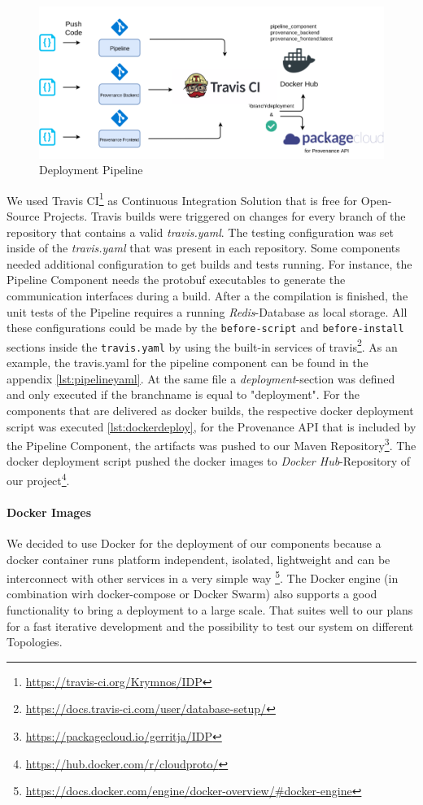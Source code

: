 \begin{figure}[h!]
	\includegraphics[width=\textwidth]{figures/deployment.png}
	\caption{Deployment Pipeline}
	\label{fig:deployment}
\end{figure}


We used Travis CI\footnote{\url{https://travis-ci.org/Krymnos/IDP}} as Continuous Integration Solution that is free for Open-Source Projects. Travis builds were triggered on changes for every branch of the repository that contains a valid \emph{travis.yaml}.
The testing configuration was set inside of the \emph{travis.yaml} that was present in each repository. Some components needed additional configuration to get builds and tests running. For instance, the Pipeline Component needs the protobuf executables to generate the communication interfaces during a build. After a the compilation is finished, the unit tests of the Pipeline requires a running \emph{Redis}-Database as local storage. All these configurations could be made by the \texttt{before-script} and \texttt{before-install} sections inside the \texttt{travis.yaml} by using the built-in services of travis\footnote{\url{https://docs.travis-ci.com/user/database-setup/}}. As an example, the travis.yaml for the pipeline component can be found in the appendix \ref{lst:pipelineyaml}.
At the same file a \emph{deployment}-section was defined and only executed if the branchname is equal to "deployment". For the components that are delivered as docker builds, the respective docker deployment script was executed \ref{lst:dockerdeploy}, for the Provenance API that is included by the Pipeline Component, the artifacts was pushed to our Maven Repository\footnote{\url{https://packagecloud.io/gerritja/IDP}}. The docker deployment script pushed the docker images to \emph{Docker Hub}-Repository of our project\footnote{\url{https://hub.docker.com/r/cloudproto/}}.

\paragraph*{Docker Images}
We decided to use Docker for the deployment of our components because a docker container runs platform independent, isolated, lightweight and can be interconnect with other services in a very simple way \footnote{\url{https://docs.docker.com/engine/docker-overview/\#docker-engine}}. The Docker engine (in combination wirh docker-compose or Docker Swarm) also supports a good functionality to bring a deployment to a large scale. That suites well to our plans for a fast iterative development and the possibility to test our system on different Topologies.

